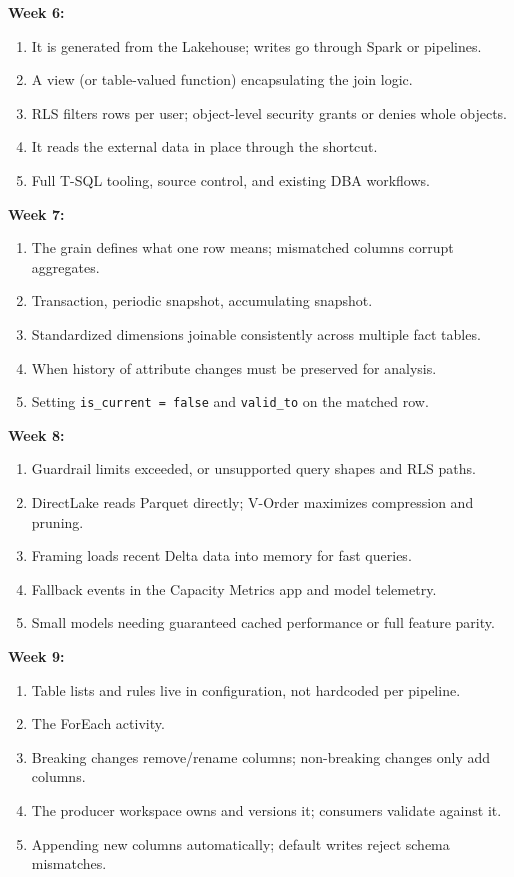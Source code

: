 \documentclass[11pt, a4paper]{article}
\begin{document}
\noindent\textbf{Week 6:}
\begin{enumerate}[leftmargin=8mm, itemsep=0pt]
    \item It is generated from the Lakehouse; writes go through Spark or pipelines.
    \item A view (or table-valued function) encapsulating the join logic.
    \item RLS filters rows per user; object-level security grants or denies whole objects.
    \item It reads the external data in place through the shortcut.
    \item Full T-SQL tooling, source control, and existing DBA workflows.
\end{enumerate}

\noindent\textbf{Week 7:}
\begin{enumerate}[leftmargin=8mm, itemsep=0pt]
    \item The grain defines what one row means; mismatched columns corrupt aggregates.
    \item Transaction, periodic snapshot, accumulating snapshot.
    \item Standardized dimensions joinable consistently across multiple fact tables.
    \item When history of attribute changes must be preserved for analysis.
    \item Setting \texttt{is\_current = false} and \texttt{valid\_to} on the matched row.
\end{enumerate}

\noindent\textbf{Week 8:}
\begin{enumerate}[leftmargin=8mm, itemsep=0pt]
    \item Guardrail limits exceeded, or unsupported query shapes and RLS paths.
    \item DirectLake reads Parquet directly; V-Order maximizes compression and pruning.
    \item Framing loads recent Delta data into memory for fast queries.
    \item Fallback events in the Capacity Metrics app and model telemetry.
    \item Small models needing guaranteed cached performance or full feature parity.
\end{enumerate}

\noindent\textbf{Week 9:}
\begin{enumerate}[leftmargin=8mm, itemsep=0pt]
    \item Table lists and rules live in configuration, not hardcoded per pipeline.
    \item The ForEach activity.
    \item Breaking changes remove/rename columns; non-breaking changes only add columns.
    \item The producer workspace owns and versions it; consumers validate against it.
    \item Appending new columns automatically; default writes reject schema mismatches.
\end{enumerate}
\end{document}
